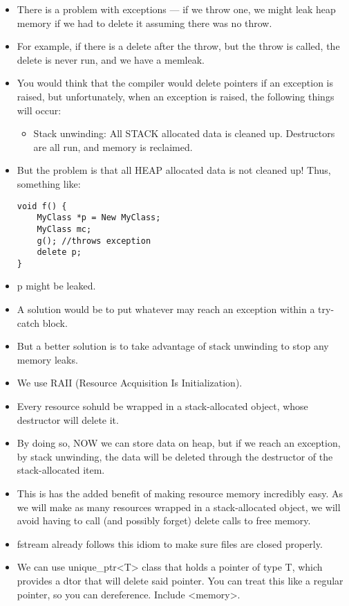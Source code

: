 \documentclass{article}
\begin{document}
\begin{itemize}
\item There is a problem with exceptions --- if we throw  one, we might leak heap memory if we had to delete it assuming there was no throw.
\item For example, if there is a delete after the throw, but the throw is called, the delete is never run, and we have a memleak.
\item You would think that the compiler would delete pointers if an exception is raised, but unfortunately, when an exception is raised, the following things will occur:
\begin{itemize}
\item Stack unwinding:  All STACK allocated data is cleaned up.  Destructors are all run, and memory is reclaimed.
\end{itemize}
\item But the problem is that all HEAP allocated data is not cleaned up!  Thus, something like:
\begin{lstlisting}
void f() {
    MyClass *p = New MyClass;
    MyClass mc;
    g(); //throws exception
    delete p;
}
\end{lstlisting}
\item p might be leaked.
\item A solution would be to put whatever may reach an exception within a try-catch block.
\item But a better solution is to take advantage of stack unwinding to stop any memory leaks.
\item We use RAII (Resource Acquisition Is Initialization).  
\item Every resource sohuld be wrapped in a stack-allocated object, whose destructor will delete it.
\item By doing so, NOW we can store data on heap, but if we reach an exception, by stack unwinding, the data will be deleted through the destructor of the stack-allocated item.
\item This is has the added benefit of making resource memory incredibly easy.  As we will make as many resources wrapped in a stack-allocated object, we will avoid having to call (and possibly forget) delete calls to free memory.
\item fstream already follows this idiom to make sure files are closed properly.
\item We can use unique\_ptr<T> class that holds a pointer of type T, which provides a dtor that will delete said pointer.  You can treat this like a regular pointer, so you can dereference.  Include <memory>.

\end{itemize}
\end{document}
